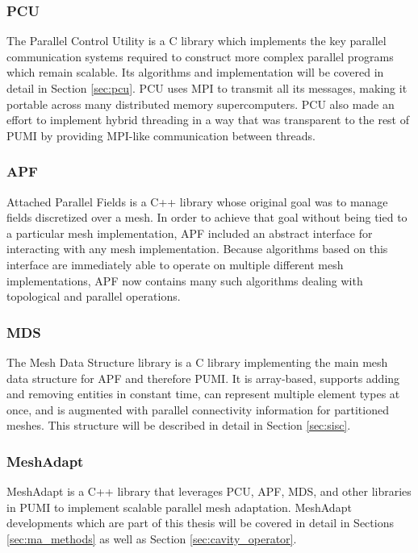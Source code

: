 \subsubsection{PCU}

The Parallel Control Utility is a C library which implements the key parallel communication
systems required to construct more complex parallel programs
which remain scalable.
Its algorithms and implementation will be covered in detail
in Section \ref{sec:pcu}.
PCU uses MPI to transmit all its messages, making it portable
across many distributed memory supercomputers.
PCU also made an effort to implement hybrid threading in
a way that was transparent to the rest of PUMI by providing
MPI-like communication between threads.

\subsubsection{APF}

Attached Parallel Fields is a C++ library whose original goal was to manage fields discretized
over a mesh.
In order to achieve that goal without being tied to a particular mesh
implementation, APF included an abstract interface for interacting
with any mesh implementation.
Because algorithms based on this interface are immediately able to
operate on multiple different mesh implementations, APF now contains
many such algorithms dealing with topological and parallel operations.

\subsubsection{MDS}

The Mesh Data Structure library is a C library implementing the main mesh data structure for APF and
therefore PUMI.
It is array-based, supports adding and removing entities in constant time,
can represent multiple element types at once, and is augmented with
parallel connectivity information for partitioned meshes.
This structure will be described in detail in Section \ref{sec:sisc}.

\subsubsection{MeshAdapt}

MeshAdapt is a C++ library that leverages PCU, APF, MDS, and other
libraries in PUMI to implement scalable parallel mesh adaptation.
MeshAdapt developments which are part of this thesis will be covered
in detail in Sections \ref{sec:ma_methods} as well as Section
\ref{sec:cavity_operator}.

